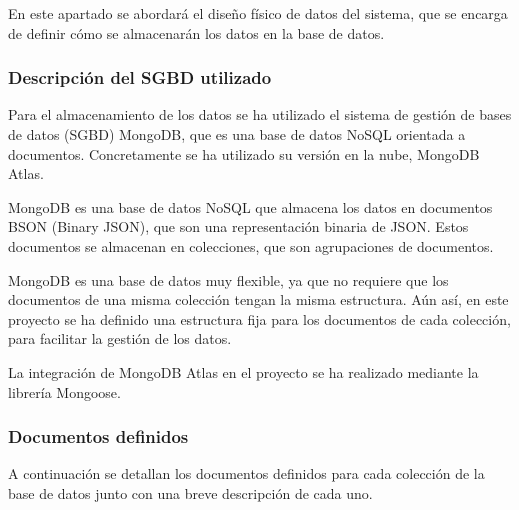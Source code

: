 En este apartado se abordará el diseño físico de datos del sistema, que se encarga de definir cómo se almacenarán los datos en la base de datos.

\subsubsection{Descripción del SGBD utilizado}
Para el almacenamiento de los datos se ha utilizado el sistema de gestión de bases de datos (SGBD) MongoDB, que es una base de datos NoSQL orientada a documentos.
Concretamente se ha utilizado su versión en la nube, MongoDB Atlas.

MongoDB es una base de datos NoSQL que almacena los datos en documentos BSON (Binary JSON), que son una representación binaria de JSON.
Estos documentos se almacenan en colecciones, que son agrupaciones de documentos.

MongoDB es una base de datos muy flexible, ya que no requiere que los documentos de una misma colección tengan la misma estructura.
Aún así, en este proyecto se ha definido una estructura fija para los documentos de cada colección, para facilitar la gestión de los datos.

La integración de MongoDB Atlas en el proyecto se ha realizado mediante la librería Mongoose.

\subsubsection{Documentos definidos}
A continuación se detallan los documentos definidos para cada colección de la base de datos junto con una breve descripción de cada uno.

